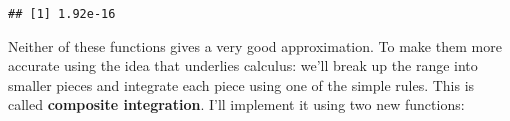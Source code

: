 \begin{verbatim}
## [1] 1.92e-16
\end{verbatim}

Neither of these functions gives a very good approximation. To make them
more accurate using the idea that underlies calculus: we'll break up the
range into smaller pieces and integrate each piece using one of the
simple rules. This is called \textbf{composite integration}. I'll
implement it using two new functions:

\begin{Shaded}
\begin{Highlighting}[]
\StringTok{ } \NormalTok{) \{}
\StringTok{ }\OperatorTok{+}\StringTok{ }\NormalTok{)}
\StringTok{ }\OperatorTok{-}\StringTok{ }\OperatorTok{/}\StringTok{ }

\StringTok{ }
   
\StringTok{ }\OperatorTok{+}\StringTok{ }\OperatorTok{*}\StringTok{ }\OperatorTok{+}\StringTok{ }\NormalTok{points[i }\OperatorTok{+}\StringTok{ }\NormalTok{]) }\OperatorTok{/}\StringTok{ }\NormalTok{)}
\NormalTok{  \}}
\NormalTok{\}}

\StringTok{ } \NormalTok{) \{}
\StringTok{ }\OperatorTok{+}\StringTok{ }\NormalTok{)}
\StringTok{ }\OperatorTok{-}\StringTok{ }\OperatorTok{/}\StringTok{ }

\StringTok{ }
   
\StringTok{ }\OperatorTok{+}\StringTok{ }\OperatorTok{/}\StringTok{ } \OperatorTok{*}\StringTok{ }\NormalTok{(}\OperatorTok{+}\StringTok{ }\NormalTok{(points[i }\OperatorTok{+}\StringTok{ }\NormalTok{]))}
\NormalTok{  \}}
\NormalTok{\}}

 \NormalTok{)}
\end{Highlighting}
\end{Shaded}

